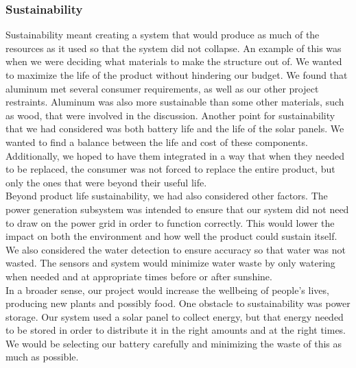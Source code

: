 \subsubsection{Sustainability}
Sustainability meant creating a system that would produce as much of the resources as it used so that the system did not collapse. An example of this was when we were deciding what materials to make the structure out of. We wanted to maximize the life of the product without hindering our budget. We found that aluminum met several consumer requirements, as well as our other project restraints. Aluminum was also more sustainable than some other materials, such as wood, that were involved in the discussion. Another point for sustainability that we had considered was both battery life and the life of the solar panels. We wanted to find a balance between the life and cost of these components. Additionally, we hoped to have them integrated in a way that when they needed to be replaced, the consumer was not forced to replace the entire product, but only the ones that were beyond their useful life.\\

Beyond product life sustainability, we had also considered other factors. The power generation subsystem was intended to ensure that our system did not need to draw on the power grid in order to function correctly. This would lower the impact on both the environment and how well the product could sustain itself. We also considered the water detection to ensure accuracy so that water was not wasted. The sensors and system would minimize water waste by only watering when needed and at appropriate times before or after sunshine.\\

In a broader sense, our project would increase the wellbeing of people’s lives, producing new plants and possibly food. One obstacle to sustainability was power storage. Our system used a solar panel to collect energy, but that energy needed to be stored in order to distribute it in the right amounts and at the right times. We would be selecting our battery carefully and minimizing the waste of this as much as possible.\\
